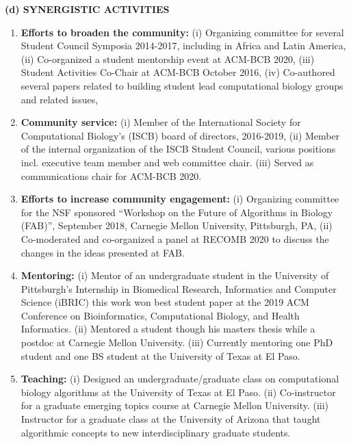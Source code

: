 \documentclass{nsfbiosketch}
\begin{document}
\textbf{(d) SYNERGISTIC ACTIVITIES}\\[5pt]
\vspace{-1.5em}
\begin{enumerate}
\item \textbf{Efforts to broaden the community:} 
(i) Organizing committee for several Student Council Symposia 2014-2017, including in Africa and Latin America,
(ii) Co-organized a student mentorship event at ACM-BCB 2020, 
(iii) Student Activities Co-Chair at ACM-BCB October 2016,
(iv) Co-authored several papers related to building student lead computational biology groups and related issues, 

\item \textbf{Community service:}
(i) Member of the International Society for Computational Biology’s (ISCB) board of directors, 2016-2019, 
(ii) Member of the internal organization of the ISCB Student Council, various positions incl. executive team member and web committee chair.
(iii) Served as communications chair for ACM-BCB 2020. 

\item \textbf{Efforts to increase community engagement:}
(i) Organizing committee for the NSF sponsored “Workshop on the Future of Algorithms in Biology (FAB)”, September 2018, Carnegie Mellon University, Pittsburgh, PA, 
(ii) Co-moderated and co-organized a panel at RECOMB 2020 to discuss the changes in the ideas presented at FAB. 


\item \textbf{Mentoring:} 
(i) Mentor of an undergraduate student in the University of Pittsburgh’s Internship in Biomedical Research, Informatics and Computer Science (iBRIC) this work won best student paper at the 2019 ACM Conference on Bioinformatics, Computational Biology, and Health Informatics. 
(ii) Mentored a student though his masters thesis while a postdoc at Carnegie Mellon University. 
(iii) Currently mentoring one PhD student and one BS student at the University of Texas at El Paso.

\item \textbf{Teaching:} 
(i) Designed an undergraduate/graduate class on computational biology algorithms at the University of Texas at El Paso. 
(ii) Co-instructor for a graduate emerging topics course at Carnegie Mellon University. 
(iii) Instructor for a graduate class at the University of Arizona that taught algorithmic concepts to new interdisciplinary graduate students.
\end{enumerate}
\end{document}

